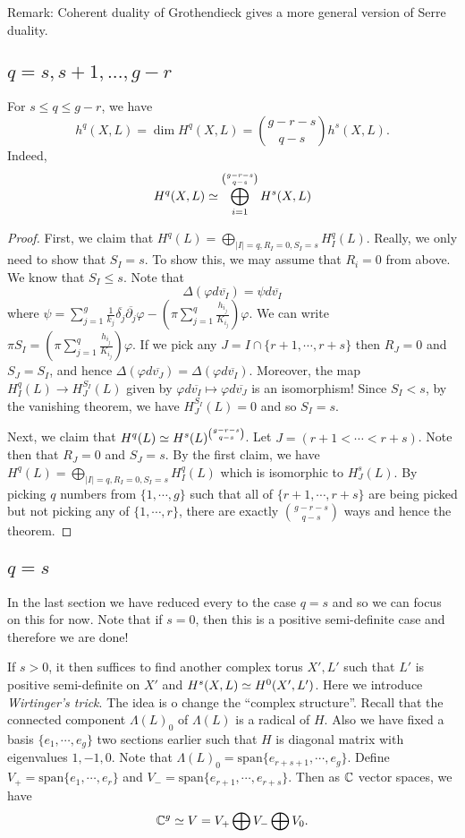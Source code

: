 Remark: Coherent duality of Grothendieck gives a more general version of Serre duality.

\subsection{$q=s,s+1,...,g-r$}

\begin{theorem}
For $s\leq q \leq g-r$, we have 
$$h^q(X,L)=\dim H^q(X,L)=\binom{g-r-s}{q-s} h^s(X,L).$$
Indeed, 
$$H^q(X,L)\simeq \bigoplus_{i=1}^{\binom{g-r-s}{q-s}}H^s(X,L)$$
\end{theorem}
\begin{proof}
First, we claim that $H^q(L)=\bigoplus_{|I|=q, R_I=0, S_I=s} H_I^q(L)$. 
Really, we only need to show that $S_I=s$. To show this, we may assume that $R_i=0$ from above. We know that $S_I\leq s$. Note that 
$$\Delta(\varphi d\overline{v_I})=\psi d\overline{v_I}$$
where $\psi=\sum_{j=1}^g \frac{1}{k_j} \overline{\delta_j}\overline{\partial_j}\varphi-(\pi \sum_{j=1}^q \frac{h_{i_j}}{K_{i_j}})\varphi$. We can write $\pi S_I=(\pi \sum_{j=1}^q \frac{h_{i_j}}{K_{i_j}})\varphi$. If we pick any $J=I\cap \{r+1,\cdots,r+s\}$ then $R_J=0$ and $S_J=S_I$, and hence $\Delta(\varphi d\overline{v_J})=\Delta(\varphi d\overline{v_I})$. 
Moreover, the map $H_I^q(L)\to H_J^{S_I}(L)$ given by $\varphi d\overline{v_I}\mapsto \varphi d\overline{v_J}$ is an isomorphism! Since $S_I<s$, by the vanishing theorem, we have $H_J^{S_I}(L)=0$ and so $S_I=s$. 

Next, we claim that $H^q(L)\simeq H^s(L)^{\binom{g-r-s}{q-s}}$. Let $J=(r+1<\cdots <r+s)$. Note then that $R_J=0$ and $S_J=s$. By the first claim, we have $H^q(L)=\bigoplus_{|I|=q, R_I=0, S_I=s} H_I^q(L)$ which is isomorphic to $H_J^s(L)$. By picking $q$ numbers from $\{1,\cdots, g\}$ such that all of $\{r+1,\cdots,r+s\}$ are being picked but not picking any of $\{1,\cdots, r\}$, there are exactly $\binom{g-r-s}{q-s}$ ways and hence the theorem.
\end{proof}

\subsection{$q=s$}
In the last section we have reduced every to the case $q=s$ and so we can focus on this for now. Note that if $s=0$, then this is a positive semi-definite case and therefore we are done! 

If $s>0$, it then suffices to find another complex torus $X',L'$ such that $L'$ is positive semi-definite on $X'$ and $H^s(X,L)\simeq H^0(X',L')$. Here we introduce \emph{Wirtinger's trick}. The idea is o change the ``complex structure''. Recall that the connected component $\Lambda(L)_0$ of $\Lambda(L)$ is a radical of $H$. Also we have fixed a basis $\{e_1,\cdots, e_g\}$ two sections earlier such that $H$ is diagonal matrix with eigenvalues $1,-1,0$. Note that $\Lambda(L)_0=\text{span}\{e_{r+s+1},\cdots, e_g\}$.
Define $V_+=\text{span}\{e_1,\cdots,e_r\}$ and $V_-=\text{span}\{e_{r+1},\cdots,e_{r+s}\}$. Then as ${\mathbb C}$ vector spaces, we have
$${\mathbb C}^g\simeq V = V_+\bigoplus V_- \bigoplus V_0.$$


